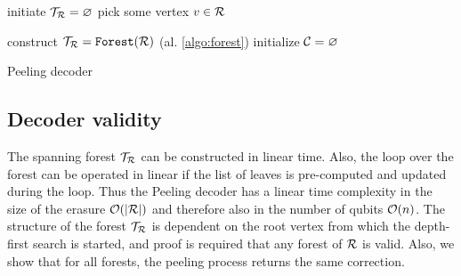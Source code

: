 \begin{algorithm}[h]
  \BlankLine
  \BlankLine
  initiate $\mathcal{T}_{\mathcal{R}} = \varnothing$ \;
  pick some vertex $v \in \mathcal{R}$ \;
  \BlankLine
  \caption{}\label{algo:forest}
\end{algorithm}



\begin{algorithm}[h]
  \BlankLine
  \BlankLine
  construct $\mathcal{T}_{\mathcal{R}} = \texttt{Forest}(\mathcal{R})$ (al. \ref{algo:forest})\;
  initialize $\mathcal{C} = {\varnothing}$\;
  \BlankLine
  \caption{Peeling decoder \cite{delfosse2017linear}}\label{algo:peel}
\end{algorithm}

\subsection{Decoder validity}
The spanning forest $\mathcal{T}_{\mathcal{R}}$ can be constructed in linear time. Also, the loop over the forest can be operated in linear if the list of leaves is pre-computed and updated during the loop. Thus the Peeling decoder has a linear time complexity in the size of the erasure $\mathcal{O}(\abs{\mathcal{R}})$ and therefore also in the number of qubits $\mathcal{O}(n)$. The structure of the forest $\mathcal{T}_{\mathcal{R}}$ is dependent on the root vertex from which the depth-first search is started, and proof is required that any forest of $\mathcal{R}$ is valid. Also, we show that for all forests, the peeling process returns the same correction.

